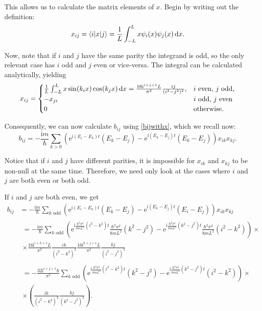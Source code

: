 \documentclass{article}
\newcommand{\e}{\mathrm{e}}
\newcommand{\I}{\mathrm{i}}
\begin{document}
This allows us to calculate the matrix elements of $x$. Begin by writing out the definition:
\begin{equation*}
x_{ij} = \braket{i|x|j} = \frac1{L} \int_{-L}^L x \psi_i(x) \psi_j(x) \dl x.
\end{equation*}

Now, note that if $i$ and $j$ have the same parity the integrand is odd, so the only relevant case has $i$ odd and $j$ even or vice-versa. The integral can be calculated analytically, yielding
\begin{equation}
x_{ij} = \begin{cases}
\frac1{L} \int_{-L}^L x \sin(k_i x) \cos(k_j x) \dl x = \frac{16 \I^{i+j+1} L}{\pi^2} \frac{ij}{(i^2 - j^2)^2}, & \text{$i$ even, $j$ odd,}\\
-x_{ji} & \text{$i$ odd, $j$ even}\\
0 & \text{otherwise.}
\end{cases}
\end{equation}

Consequently, we can now calculate $b_{ij}$ using \eqref{bijwithx}, which we recall now:
\[b_{ij} = - \frac{\I m}{\hbar} \sum_{k>0} \left( \e^{\I (E_i - E_k) t} (E_k - E_j) - \e^{\I (E_k - E_j) t} (E_k - E_j) \right) x_{ik} x_{kj}.\]

Notice that if $i$ and $j$ have different parities, it is impossible for $x_{ik}$ and $x_{kj}$ to be non-null at the same time. Therefore, we need only look at the cases where $i$ and $j$ are both even or both odd.

If $i$ and $j$ are both even, we get
\begin{align*}
b_{ij} &= - \frac{\I m}{\hbar} \sum_{\text{$k$ odd}} \left( \e^{\I (E_i - E_k) t} (E_k - E_j) - \e^{\I (E_k - E_j) t} (E_i - E_j) \right) x_{ik} x_{kj}\\
&
\begin{multlined}
= - \frac{\I m}{\hbar} \sum_{\text{$k$ odd}} \left( \e^{\I \frac{\hbar^2 \pi^2}{8m L^2} (i^2 - k^2) t} \tfrac{\hbar^2 \pi^2}{8m L^2} (k^2 - j^2) - \e^{\I \frac{\hbar^2 \pi^2}{8m L^2} (k^2 - j^2) t} \tfrac{\hbar^2 \pi^2}{8m L^2} (i^2 - k^2) \right)\times\\
\times \frac{16 \I^{i+k+1} L}{\pi^2} \frac{ik}{(i^2 - k^2)^2} \frac{16 \I^{k+j+1} L}{\pi^2} \frac{kj}{(i^2 - j^2)^2}
\end{multlined}\\
&\begin{multlined}
= -\frac{32 \I^{i+j+1} \hbar}{\pi^2} \sum_{\text{$k$ odd}} \left(
\e^{\I \frac{\hbar^2 \pi^2}{8m L^2} (i^2 - k^2) t} (k^2 - j^2) - \e^{\I \frac{\hbar^2 \pi^2}{8m L^2} (k^2 - j^2) t} (i^2 - k^2) \right)\times\\
\times\left(\frac{ik}{(i^2 - k^2)^2}\frac{kj}{(k^2 - j^2)^2}\right).
\end{multlined}
\end{align*}
\end{document}
